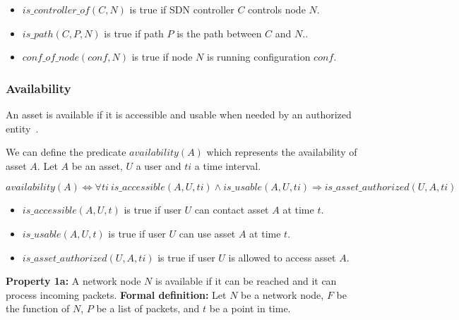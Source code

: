 \begin{itemize}
\item $is\_controller\_of(C,N)$ is true if SDN controller $C$ controls node $N$.  
\item $is\_path(C,P,N)$ is true if path $P$ is the path between $C$ and $N$..
\item $conf\_of\_node(conf, N)$ is true if node $N$ is running configuration $conf$.
\end{itemize}

\subsubsection{Availability}
\label{sec:prop-avail}
An asset is available if it is accessible and usable when
needed by an authorized entity~\cite{ISO/IEC270012013}.

We can define the predicate $availability(A)$ which represents the availability of asset $A$.
\newline
Let $A$ be an asset, $U$ a user and $ti$ a time interval.
\newline

\begin{myformula}
$availability(A) \Leftrightarrow \forall ti~is\_accessible(A,U,ti) \wedge is\_usable(A,U,ti) \Rightarrow is\_asset\_authorized(U,A,ti)$
\end{myformula}

\begin{itemize}
\item $is\_accessible(A,U,t)$ is true if user $U$ can contact asset $A$ at time $t$.
\item $is\_usable(A,U,t)$ is true if user $U$ can use asset $A$ at time $t$.
\item $is\_asset\_authorized(U,A,ti)$ is true if user $U$ is allowed to access asset $A$.
\end{itemize}

\textbf{Property 1a:} A network node $N$ is available if it can be reached and it can process incoming packets.
\newline
\textbf{Formal definition:} Let $N$ be a network node, $F$ be the function of $N$, $P$ be a list of packets, and $t$ be a point in time.

